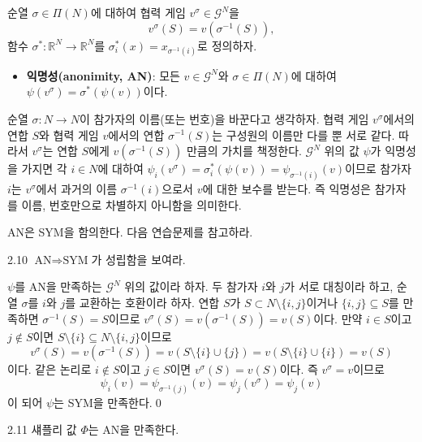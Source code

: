 \documentclass{article}
\numberwithin{equation}{section}
\begin{document}
순열 $\sigma\in\Pi(N)$에 대하여 협력 게임 $v^\sigma\in\mathcal G^N$을
\[
	v^\sigma(S)=v(\sigma^{-1}(S)),
\]
함수 $\sigma^*:\mathbb R^N\to\mathbb R^N$를 $\sigma^*_i(x)=x_{\sigma^{-1}(i)}$로 정의하자.
\begin{itemize}
	\item \textbf{익명성(anonimity, AN)}: 모든 $v\in\mathcal G^N$와 $\sigma\in\Pi(N)$에 대하여 $\psi(v^\sigma)=\sigma^*(\psi(v))$이다.
\end{itemize}
순열 $\sigma:N\to N$이 참가자의 이름(또는 번호)을 바꾼다고 생각하자. 협력 게임 $v^\sigma$에서의 연합 $S$와 협력 게임 $v$에서의 연합 $\sigma^{-1}(S)$는 구성원의 이름만 다를 뿐 서로 같다. 따라서 $v^\sigma$는 연합 $S$에게 $v(\sigma^{-1}(S))$ 만큼의 가치를 책정한다. $\mathcal G^N$ 위의 값 $\psi$가 익명성을 가지면 각 $i\in N$에 대하여 $\psi_i(v^\sigma)=\sigma^*_i(\psi(v))=\psi_{\sigma^{-1}(i)}(v)$이므로 참가자 $i$는 $v^\sigma$에서 과거의 이름 $\sigma^{-1}(i)$으로서 $v$에 대한 보수를 받는다. 즉 익명성은 참가자를 이름, 번호만으로 차별하지 아니함을 의미한다.

AN은 SYM을 함의한다. 다음 연습문제를 참고하라.

\begin{prob}{}{2.10}
	$\text{AN}\Longrightarrow\text{SYM}$가 성립함을 보여라.
\end{prob}

\begin{sol}
	$\psi$를 AN을 만족하는 $\mathcal G^N$ 위의 값이라 하자. 두 참가자 $i$와 $j$가 서로 대칭이라 하고, 순열 $\sigma$를 $i$와 $j$를 교환하는 호환이라 하자. 연합 $S$가 $S\subset N\setminus\{i,j\}$이거나 $\{i,j\}\subseteq S$를 만족하면 $\sigma^{-1}(S)=S$이므로 $v^\sigma(S)=v(\sigma^{-1}(S))=v(S)$이다. 만약 $i\in S$이고 $j\notin S$이면 $S\setminus\{i\}\subseteq N\setminus\{i,j\}$이므로
	\[
		v^\sigma(S)=v(\sigma^{-1}(S))=v(S\setminus\{i\}\cup\{j\})=v(S\setminus\{i\}\cup\{i\})=v(S)
	\]
	이다. 같은 논리로 $i\notin S$이고 $j\in S$이면 $v^\sigma(S)=v(S)$이다. 즉 $v^\sigma=v$이므로
	\[
		\psi_i(v)=\psi_{\sigma^{-1}(j)}(v)=\psi_j(v^\sigma)=\psi_j(v)
	\]
	이 되어 $\psi$는 SYM을 만족한다.\qed
\end{sol}

\newpage
\begin{thm}{}{2.11}
	섀플리 값 $\Phi$는 AN을 만족한다.
\end{thm}
\end{document}
